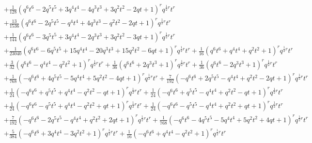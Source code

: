 \documentclass[11pt,english]{amsart}
\numberwithin{equation}{section}
\numberwithin{figure}{section}
\theoremstyle{plain}
\theoremstyle{plain}
\theoremstyle{definition}
\theoremstyle{remark}
\begin{document}
{\begin{align*}
& + \frac{1}{128} {\left(q^{6} t^{6} - 2 q^{5} t^{5} + 3 q^{4} t^{4} - 4 q^{3} t^{3} + 3 q^{2} t^{2} - 2 q t + 1\right)}^{r} q^{\frac{1}{2} r}t^{r} \\
& + \frac{13}{1536} {\left(q^{6} t^{6} - 2 q^{5} t^{5} - q^{4} t^{4} + 4 q^{3} t^{3} - q^{2} t^{2} - 2 q t + 1\right)}^{r} q^{\frac{1}{2} r}t^{r} \\
& + \frac{1}{144} {\left(q^{6} t^{6} - 3 q^{5} t^{5} + 3 q^{4} t^{4} - 2 q^{3} t^{3} + 3 q^{2} t^{2} - 3 q t + 1\right)}^{r} q^{\frac{1}{2} r}t^{r} \\
& + \frac{1}{23040} {\left(q^{6} t^{6} - 6 q^{5} t^{5} + 15 q^{4} t^{4} - 20 q^{3} t^{3} + 15 q^{2} t^{2} - 6 q t + 1\right)}^{r} q^{\frac{1}{2} r}t^{r} + \frac{1}{16} {\left(q^{6} t^{6} + q^{4} t^{4} + q^{2} t^{2} + 1\right)}^{r} q^{\frac{1}{2} r}t^{r} \\
& + \frac{3}{32} {\left(q^{6} t^{6} - q^{4} t^{4} - q^{2} t^{2} + 1\right)}^{r} q^{\frac{1}{2} r}t^{r} + \frac{1}{36} {\left(q^{6} t^{6} + 2 q^{3} t^{3} + 1\right)}^{r} q^{\frac{1}{2} r}t^{r} + \frac{1}{36} {\left(q^{6} t^{6} - 2 q^{3} t^{3} + 1\right)}^{r} q^{\frac{1}{2} r}t^{r} \\
& + \frac{1}{768} {\left(-q^{6} t^{6} + 4 q^{5} t^{5} - 5 q^{4} t^{4} + 5 q^{2} t^{2} - 4 q t + 1\right)}^{r} q^{\frac{1}{2} r}t^{r} + \frac{7}{192} {\left(-q^{6} t^{6} + 2 q^{5} t^{5} - q^{4} t^{4} + q^{2} t^{2} - 2 q t + 1\right)}^{r} q^{\frac{1}{2} r}t^{r} \\
& + \frac{1}{24} {\left(-q^{6} t^{6} + q^{5} t^{5} + q^{4} t^{4} - q^{2} t^{2} - q t + 1\right)}^{r} q^{\frac{1}{2} r}t^{r} + \frac{1}{24} {\left(-q^{6} t^{6} + q^{5} t^{5} - q^{4} t^{4} + q^{2} t^{2} - q t + 1\right)}^{r} q^{\frac{1}{2} r}t^{r} \\
& + \frac{1}{24} {\left(-q^{6} t^{6} - q^{5} t^{5} + q^{4} t^{4} - q^{2} t^{2} + q t + 1\right)}^{r} q^{\frac{1}{2} r}t^{r} + \frac{1}{24} {\left(-q^{6} t^{6} - q^{5} t^{5} - q^{4} t^{4} + q^{2} t^{2} + q t + 1\right)}^{r} q^{\frac{1}{2} r}t^{r} \\
& + \frac{7}{192} {\left(-q^{6} t^{6} - 2 q^{5} t^{5} - q^{4} t^{4} + q^{2} t^{2} + 2 q t + 1\right)}^{r} q^{\frac{1}{2} r}t^{r} + \frac{1}{768} {\left(-q^{6} t^{6} - 4 q^{5} t^{5} - 5 q^{4} t^{4} + 5 q^{2} t^{2} + 4 q t + 1\right)}^{r} q^{\frac{1}{2} r}t^{r} \\
& + \frac{5}{384} {\left(-q^{6} t^{6} + 3 q^{4} t^{4} - 3 q^{2} t^{2} + 1\right)}^{r} q^{\frac{1}{2} r}t^{r} + \frac{1}{16} {\left(-q^{6} t^{6} + q^{4} t^{4} - q^{2} t^{2} + 1\right)}^{r} q^{\frac{1}{2} r}t^{r} \\

\end{align*}}
\end{document}
